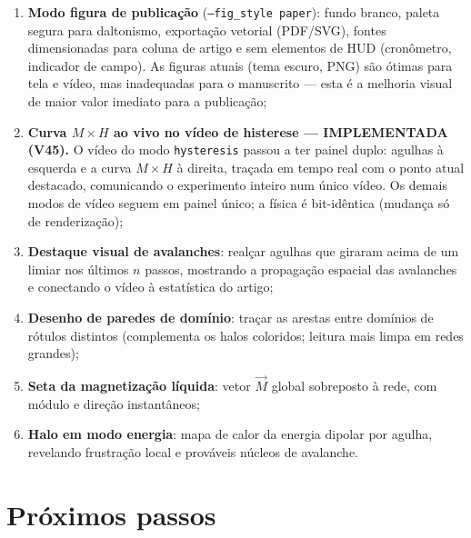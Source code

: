 \documentclass[11pt,a4paper]{article}
\newcommand{\code}[1]{\texttt{#1}}
\begin{document}
\begin{enumerate}
\item \textbf{Modo figura de publicação} (\code{--fig\_style paper}):
fundo branco, paleta segura para daltonismo, exportação vetorial
(PDF/SVG), fontes dimensionadas para coluna de artigo e sem elementos de
HUD (cronômetro, indicador de campo). As figuras atuais (tema escuro,
PNG) são ótimas para tela e vídeo, mas inadequadas para o manuscrito ---
esta é a melhoria visual de maior valor imediato para a publicação;
\item \textbf{Curva $M\times H$ ao vivo no vídeo de histerese ---
IMPLEMENTADA (V45).} O vídeo do modo \code{hysteresis} passou a ter
painel duplo: agulhas à esquerda e a curva $M\times H$ à direita,
traçada em tempo real com o ponto atual destacado, comunicando o
experimento inteiro num único vídeo. Os demais modos de vídeo seguem em
painel único; a física é bit-idêntica (mudança só de renderização);
\item \textbf{Destaque visual de avalanches}: realçar agulhas que
giraram acima de um limiar nos últimos $n$ passos, mostrando a
propagação espacial das avalanches e conectando o vídeo à estatística
do artigo;
\item \textbf{Desenho de paredes de domínio}: traçar as arestas entre
domínios de rótulos distintos (complementa os halos coloridos; leitura
mais limpa em redes grandes);
\item \textbf{Seta da magnetização líquida}: vetor $\vec M$ global
sobreposto à rede, com módulo e direção instantâneos;
\item \textbf{Halo em modo energia}: mapa de calor da energia dipolar
por agulha, revelando frustração local e prováveis núcleos de
avalanche.
\end{enumerate}

\section{Próximos passos}
\end{document}
